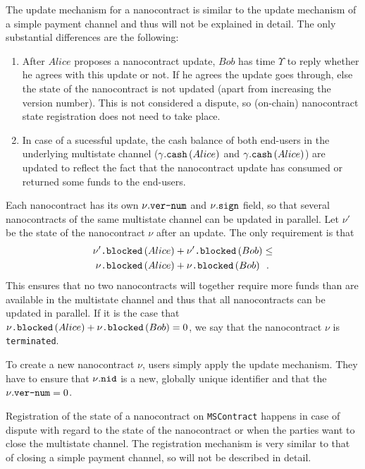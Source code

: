   The update mechanism for a nanocontract is similar to the update mechanism of a simple
  payment channel and thus will not be explained in detail. The only substantial
  differences are the following:
  \begin{enumerate}
    \item After $Alice$ proposes a nanocontract update, $Bob$ has time $\Upsilon$ to reply
    whether he agrees with this update or not. If he agrees the update goes through, else
    the state of the nanocontract is not updated (apart from increasing the version
    number). This is not considered a dispute, so (on-chain) nanocontract state
    registration does not need to take place.
    \item In case of a sucessful update, the cash balance of both end-users in the
    underlying multistate channel ($\gamma\mbox{.\texttt{cash}}\left(Alice\right)$ and
    $\gamma\mbox{.\texttt{cash}}\left(Alice\right)$) are updated to reflect the fact that
    the nanocontract update has consumed or returned some funds to the end-users.
  \end{enumerate}

  Each nanocontract has its own $\nu\mbox{.\texttt{ver-num}}$ and
  $\nu\mbox{.\texttt{sign}}$ field, so that several nanocontracts of the same multistate
  channel can be updated in parallel. Let $\nu'$ be the state of the nanocontract $\nu$
  after an update. The only requirement is that
  \begin{align*}
    \nu'\mbox{\texttt{.blocked}}\left(Alice\right) &+
    \nu'\mbox{\texttt{.blocked}}\left(Bob\right) \leq \\
    \nu\mbox{\texttt{.blocked}}\left(Alice\right) &+
    \nu\mbox{\texttt{.blocked}}\left(Bob\right) \enspace.
  \end{align*}
  This ensures that no two nanocontracts will together require more funds than are
  available in the multistate channel and thus that all nanocontracts can be updated in
  parallel. If it is the case that $\nu\mbox{\texttt{.blocked}}\left(Alice\right) +
  \nu\mbox{\texttt{.blocked}}\left(Bob\right) = 0$, we say that the nanocontract $\nu$ is
  \texttt{terminated}.

  To create a new nanocontract $\nu$, users simply apply the update mechanism. They have
  to ensure that $\nu\mbox{.\texttt{nid}}$ is a new, globally unique identifier and that
  the $\nu\mbox{.\texttt{ver-num}} = 0$.

  Registration of the state of a nanocontract on \texttt{MSContract} happens in case of
  dispute with regard to the state of the nanocontract or when the parties want to close
  the multistate channel. The registration mechanism is very similar to that of closing a
  simple payment channel, so will not be described in detail.


